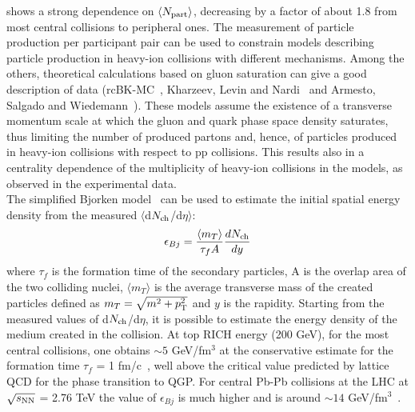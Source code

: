 shows a strong dependence on $\langle N_{\rm part}\rangle$, decreasing 
by a factor of about 1.8 from most central collisions to peripheral ones. The 
measurement of particle production per participant pair can be used to 
constrain models describing particle production in heavy-ion collisions 
with different mechanisms. Among the others, theoretical calculations 
 based on gluon saturation can give a good description of data
 (rcBK-MC~\cite{Albacete:2011fw}, Kharzeev, Levin and Nardi~\cite{Kharzeev:2004if} 
 and Armesto, Salgado and Wiedemann~\cite{Armesto:2004ud}). These models assume the existence of a
 transverse momentum scale at which the gluon and quark phase space 
 density saturates, thus limiting the number of produced partons and, 
 hence, of particles produced in heavy-ion collisions with respect to pp collisions.  
 This results also in a centrality dependence of the multiplicity of 
 heavy-ion collisions in the models, as observed in the experimental
data. \\
The simplified Bjorken model~\cite{Bjorken:1982qr} can be used to 
estimate the initial spatial energy density from the measured 
$\langle$d$N_{\rm ch}$/d$\eta$$\rangle$:
\begin{equation}
\label{Bjorken}
\epsilon_{Bj} = \frac{\langle m_T\rangle}{\tau_f A}\frac{dN_{\rm ch}}{dy}
\end{equation}
where $\tau_f$ is the formation time of the secondary particles, A is the overlap 
area of the two colliding nuclei, $\langle m_T \rangle$ is the average transverse 
mass of the created particles defined as $m_{T} = \sqrt{m^{2}+p_{\rm T}^2}$ and $y$ 
is the rapidity. Starting from the measured values of d$N_{\rm ch}$/d$\eta$, it is 
possible to estimate the energy density of the medium created in the collision.
At top RICH energy (200 GeV), for the most central collisions, one obtains 
$\sim 5$ GeV/fm$^3$ at the conservative estimate for the formation time 
$\tau_f$ = 1 fm/c~\cite{Bjorken:1982qr}, well above the critical value predicted 
by lattice QCD for the phase transition to QGP. For central Pb-Pb collisions at the LHC 
at $\sqrt{s_{\rm NN}}$ = 2.76 TeV the value of $\epsilon_{Bj}$ is much higher and is 
around $\sim 14$ GeV/fm$^3$~\cite{Chatrchyan:2012mb}.


